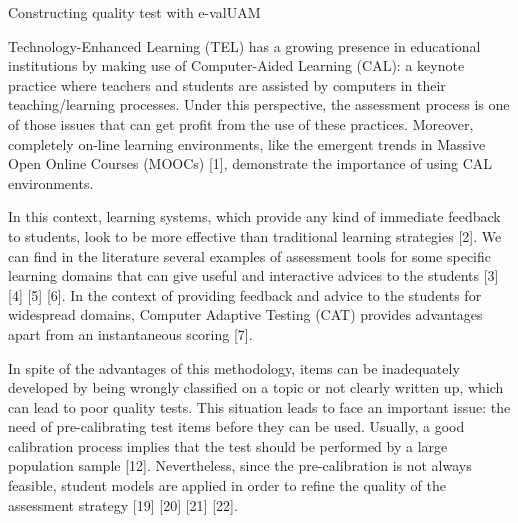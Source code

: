 Constructing quality test with e-valUAM

Technology-Enhanced Learning (TEL) has a growing presence in educational institutions by making use of Computer-Aided Learning (CAL): a keynote practice where teachers and students are assisted by computers in their teaching/learning processes. Under this perspective, the assessment process is one of those issues that can get profit from the use of these practices. Moreover, completely on-line learning environments, like the emergent trends in Massive Open Online Courses (MOOCs) [1], demonstrate the importance of using CAL environments.

In this context, learning systems, which provide any kind of immediate feedback to students, look to be more effective than traditional learning strategies [2]. We can find in the literature several examples of assessment tools for some specific learning domains that can give useful and interactive advices to the students [3] [4] [5] [6]. In the context of providing feedback and advice to the students for widespread domains, Computer Adaptive Testing (CAT) provides advantages apart from an instantaneous scoring [7]. 

In spite of the advantages of this methodology, items can be inadequately developed by being wrongly classified on a topic or not clearly written up, which can lead to poor quality tests. This situation leads to face an important issue: the need of pre-calibrating test items before they can be used. Usually, a good calibration process implies that the test should be performed by a large population sample [12]. Nevertheless, since the pre-calibration is not always feasible, student models are applied in order to refine the quality of the assessment strategy [19] [20] [21] [22].